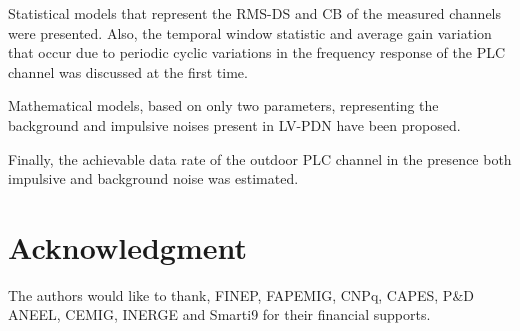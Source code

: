 \documentclass[journal]{IEEEtran}
\begin{document}
	Statistical models that represent the RMS-DS and CB of the measured channels were presented. Also, the temporal window statistic and average gain variation that occur due to periodic cyclic variations in the frequency response of the \ac{PLC} channel was discussed at the first time.
	
	Mathematical models, based on only two parameters, representing the background and impulsive noises present in \ac{LV-PDN} have been proposed.
	
	Finally, the achievable data rate of the outdoor PLC channel in the presence both impulsive and background noise was estimated.
	\section*{Acknowledgment}
	
	The authors would like to thank, FINEP, FAPEMIG, CNPq, CAPES, P\&D
	ANEEL, CEMIG, INERGE and Smarti9 for their financial supports.
	
	
	
	
\end{document}

